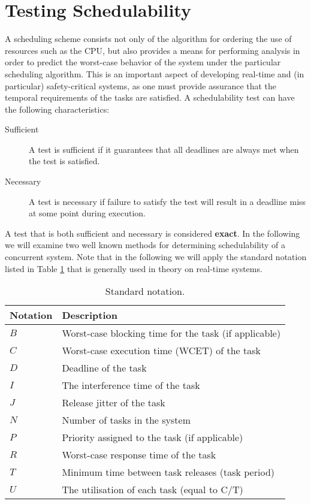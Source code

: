 \section{Testing Schedulability} %
\label{sec:schedulability_analysis}
A scheduling scheme consists not only of the algorithm for ordering the use of resources such as the CPU, but also provides a means for performing analysis in order to predict the worst-case behavior of the system under the particular scheduling algorithm. This is an important aspect of developing real-time and (in particular) safety-critical systems, as one must provide assurance that the temporal requirements of the tasks are satisfied. A schedulability test can have the following characteristics:
\begin{description}
	\item[Sufficient] A test is sufficient if it guarantees that all deadlines are always met when the test is satisfied.
	\item[Necessary] A test is necessary if failure to satisfy the test will result in a deadline miss at some point during execution.
\end{description}
A test that is both sufficient and necessary is considered \textbf{exact}. In the following we will examine two well known methods for determining schedulability of a concurrent system. Note that in the following we will apply the standard notation listed in Table \ref{table:ScheduleNotation} that is generally used in theory on real-time systems.
	\begin{table}[!h]
			\centering
			\begin{tabular}{l l}
			\hline
			\textbf{Notation} & \textbf{Description}\\
			\hline 
			$B$ 	& Worst-case blocking time for the task (if applicable)  \\
			$C$ 	& Worst-case execution time (WCET) of the task \\
			$D$   & Deadline of the task \\
			$I$ 	& The interference time of the task \\
			$J$ 	& Release jitter of the task \\
			$N$ 	& Number of tasks in the system \\
			$P$ 	& Priority assigned to the task (if applicable) \\
			$R$ 	& Worst-case response time of the task \\
			$T$ 	& Minimum time between task releases (task period) \\
			$U$ 	& The utilisation of each task (equal to C/T) \\
			\hline
			\end{tabular}
			\caption{Standard notation\cite{alan2001real}.}
		\label{table:ScheduleNotation}
	\end{table}

